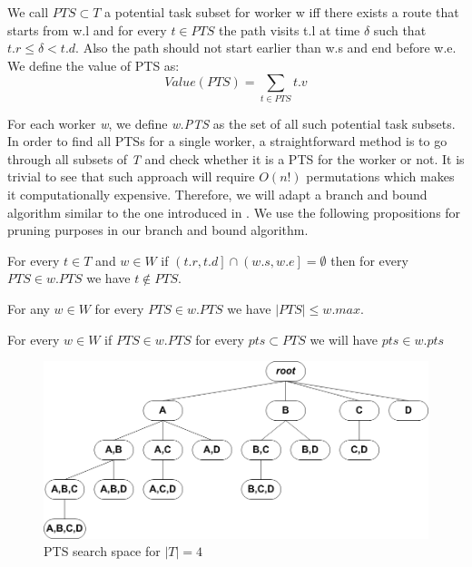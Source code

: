 \begin{definition} 
\label{def:PTS}
We call $PTS \subset T$ a potential task subset for worker w iff there exists a route that starts from w.l and for every $t \in PTS$ the path visits t.l at time $\delta$ such that $t.r \leq \delta < t.d$. Also the path should not start earlier than w.s and end before w.e. We define the value of PTS as:
\begin{equation*}
Value(PTS) = \sum_{t \in PTS} t.v
\end{equation*}
\end{definition}

For each worker \emph{w}, we define \emph{w.PTS} as the set of all such potential task subsets.\\

In order to find all PTSs for a single worker, a straightforward method is to go through all subsets of \emph{T} and check whether it is a PTS for the worker or not. It is trivial to see that such approach will require $O(n!)$ permutations which makes it computationally expensive. Therefore, we will adapt a branch and bound algorithm similar to the one introduced in \cite{Deng13}. We use the following propositions for pruning purposes in our branch and bound algorithm.

\begin{proposition}
\label{prop:overlap}
For every $t \in T$ and $w \in W$ if $\left(t.r, t.d \right] \cap \left( w.s, w.e \right] = \emptyset$ then for every $PTS \in w.PTS$ we have $t \not\in PTS$.
\end{proposition}

\begin{proposition}
\label{prop:size}
For any $w \in W$ for every $PTS \in w.PTS$ we have $\left\vert{PTS}\right\vert \leq w.max$.
\end{proposition}

\begin{proposition}
\label{prop:subset}
For every $w \in W$ if $PTS \in w.PTS$ for every $pts \subset PTS$ we will have $pts \in w.pts$
\end{proposition}

\begin{figure}[t]
	\centering
	\includegraphics[width = 0.85\columnwidth]{figures/PTS_tree.png}
			\vspace{-0.2cm}
	\caption{PTS search space for $\left\vert T \right\vert = 4$}
	\label{fig:PTS_tree}
			\vspace{-0.2cm}
\end{figure}

